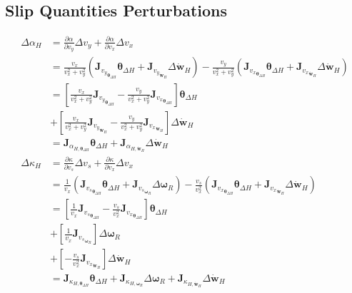 \subsection{Slip Quantities Perturbations}
\begin{equation}
    \begin{split}
        \Delta \alpha_H &= \frac{\partial{\alpha}}{\partial{v_y}} \Delta v_y + \frac{\partial{\alpha}}{\partial{v_x}} \Delta v_x\\
        &= \frac{v_x}{v_x^2 + v_y^2} \left(\mathbf{J}_{{v_y}_{\boldsymbol{\theta}_{\Delta H}}} \boldsymbol{\theta}_{\Delta H} + \mathbf{J}_{{v_y}_{\dot{\mathbf{w}}_H}} \Delta {\dot{\mathbf{w}}}_H\right) - \frac{v_y}{v_x^2 + v_y^2} \left(\mathbf{J}_{{v_x}_{\boldsymbol{\theta}_{\Delta H}}} \boldsymbol{\theta}_{\Delta H} + \mathbf{J}_{{v_x}_{\dot{\mathbf{w}}_H}} \Delta {\dot{\mathbf{w}}}_H\right)\\
        &= \left[\frac{v_x}{v_x^2 + v_y^2} \mathbf{J}_{{v_y}_{\boldsymbol{\theta}_{\Delta H}}} - \frac{v_y}{v_x^2 + v_y^2}\mathbf{J}_{{v_x}_{\boldsymbol{\theta}_{\Delta H}}}\right] \boldsymbol{\theta}_{\Delta H}\\
        &+ \left[\frac{v_x}{v_x^2 + v_y^2} \mathbf{J}_{{v_y}_{\dot{\mathbf{w}}_H}} - \frac{v_y}{v_x^2 + v_y^2}\mathbf{J}_{{v_x}_{\dot{\mathbf{w}}_H}}\right] \Delta {\dot{\mathbf{w}}}_H\\
        &= \mathbf{J}_{\alpha_{H, \boldsymbol{\theta}_{\Delta H}}}\boldsymbol{\theta}_{\Delta H} + \mathbf{J}_{\alpha_{H, \dot{\mathbf{w}}_H}}\Delta {\dot{\mathbf{w}}}_H\\
        \Delta \kappa_H &= \frac{\partial{\kappa}}{\partial{v_s}} \Delta v_s + \frac{\partial{\kappa}}{\partial{v_x}} \Delta v_x\\
        &= \frac{1}{v_x} \left(\mathbf{J}_{{v_s}_{\boldsymbol{\theta}_{\Delta H}}} \boldsymbol{\theta}_{\Delta H} + \mathbf{J}_{{v_s}_{\boldsymbol{\omega}_R}} \Delta \boldsymbol{\omega}_R\right) - \frac{v_s}{v_x^2} \left(\mathbf{J}_{{v_x}_{\boldsymbol{\theta}_{\Delta H}}} \boldsymbol{\theta}_{\Delta H} + \mathbf{J}_{{v_x}_{\dot{\mathbf{w}}_H}} \Delta {\dot{\mathbf{w}}}_H\right) \\
        &= \left[\frac{1}{v_x} \mathbf{J}_{{v_s}_{\boldsymbol{\theta}_{\Delta H}}} - \frac{v_s}{v_x^2} \mathbf{J}_{{v_x}_{\boldsymbol{\theta}_{\Delta H}}}\right] \boldsymbol{\theta}_{\Delta H}\\
        &+ \left[\frac{1}{v_x} \mathbf{J}_{{v_s}_{\boldsymbol{\omega}_R}}\right] \Delta \boldsymbol{\omega}_R\\
        &+ \left[- \frac{v_s}{v_x^2} \mathbf{J}_{{v_x}_{\dot{\mathbf{w}}_H}}\right]\Delta {\dot{\mathbf{w}}}_H\\
        &= \mathbf{J}_{\kappa_{H, \boldsymbol{\theta}_{\Delta H}}}\boldsymbol{\theta}_{\Delta H} + \mathbf{J}_{\kappa_{H, \boldsymbol{\omega}_R}}\Delta \boldsymbol{\omega}_R + \mathbf{J}_{\kappa_{H, \dot{\mathbf{w}}_H}}\Delta {\dot{\mathbf{w}}}_H
    \end{split}
\end{equation}

